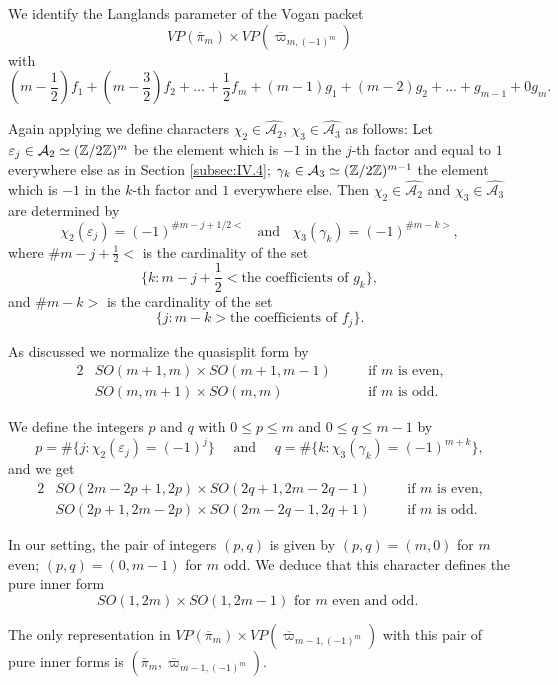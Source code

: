 We identify the Langlands parameter of the Vogan packet 
\[
VP(\overline{ \pi}_{m} ) \times VP(\overline{ \varpi }_{m,(-1)^m})
\]
 with 
 \[ (m-\frac 1 2 )f_1+(m- \frac 3 2 ) f_2 +\dots + \frac 1 2 f_m +(m-1)g_1+(m-2)g_2+ \dots +g_{m-1}+0g_{m} .\]



Again applying \cite[Prop.~12.18]{GP}
 we define characters $\chi_2 \in \widehat{{\mathcal{A}}_2} $,
 $\chi_3 \in \widehat{{\mathcal{A}}_3}$ as follows: 
Let $\varepsilon_j \in {\mathcal{A}}_2 \simeq ({\mathbb Z}/2{\mathbb Z})^m$ be
 the element which is $-1$ in the $j$-th factor
 and equal to $1$ everywhere else
 as in Section \ref{subsec:IV.4};
 $\gamma_k \in {\mathcal{A}}_3 \simeq ({\mathbb Z}/2{\mathbb Z})^{m-1}$ the element which is $-1$ in the $k$-th factor and $1$ everywhere else.
Then $\chi_2 \in \widehat{{\mathcal{A}}_2}$ and 
 $\chi_3 \in \widehat{{\mathcal{A}}_3}$ are determined by 
\[ 
 \chi_2(\varepsilon_j)= (-1)^{\#m- j +1/2<}
  \ \ \ \ \mbox{and} \ \ \ \ 
 \chi_3(\gamma_k)=  (-1)^{\#m-k >}, 
\]
where $\#m-j+\frac 1 2 <$ is the cardinality
 of the set
  \[\{k:m-j+\frac 1 2 < \text{the coefficients of $g_k$}\}, 
\]
 and $\# m-k >$ is the cardinality of the set
 \[\{j:m-k > \text{the coefficients of $f_j$}\}.\]



As discussed  we normalize the quasisplit form by 
\begin{alignat*}{2}
 &SO(m+1, m) \times SO(m+1,m-1) \quad &&\text{if $m$ is even,} 
\\
 &SO(m,m+1) \times SO(m , m)    \quad &&\text{if $m$ is odd.} 
\end{alignat*}


 We define the integers $p$ and $q$
 with $0 \leq p \leq m$ and $0 \leq q \leq m-1$
by
\[
 p  =  \# \{ j : \chi_2(    \varepsilon_j  )  = (-1)^j  \}  
\quad \mbox{ and }  
\quad  q  =  \# \{ k :  \chi_3(   \gamma _k      )  = (-1)^{m+k}  \}, 
\]
and we get
\begin{alignat*}{2}
&SO(2m-2p+1, 2p) \times SO(2q+1 ,2m-2q-1) 
\quad 
&&\mbox{if $m$ is even,}
\\
&SO(2p+1,2m-2p) \times SO(2m-2q-1, 2q+1) \quad 
&&\mbox{if $m$ is odd.}
\end{alignat*}

In our setting, the pair of integers 
 $(p,q)$ is given by $(p,q)=(m,0)$ for $m$ even;
 $(p,q)=(0,m-1)$ for $m$ odd.
We  deduce that this character defines the pure inner form 
\[
\text{
$SO(1,2m) \times SO(1,2m-1)$ for $m$ even and odd.  
}
\]


The only representation in $VP(\overline{\pi}_{m}) \times VP(\overline{\varpi}_{m-1,(-1)^m})$ with this pair of pure inner forms 
 is $(\overline{\pi}_{m}, \overline{\varpi}_{m-1,(-1)^m})$.

